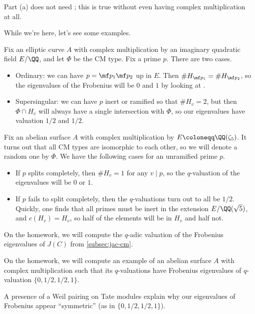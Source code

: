\documentclass[../notes.tex]{subfiles}
\begin{document}
\begin{remark}
	Part (a) does not need ; this is true without even having complex multiplication at all.
\end{remark}
While we're here, let's see some examples.
\begin{example}
	Fix an elliptic curve $A$ with complex multiplication by an imaginary quadratic field $E/\QQ$, and let $\Phi$ be the CM type. Fix a prime $p$. There are two cases.
	\begin{itemize}
		\item Ordinary: we can have $p=\mf p_1\mf p_2$ up in $E$. Then $\#H_{\mf p_1}=\#H_{\mf p_2}$, so the eigenvalues of the Frobenius will be $0$ and $1$ by looking at .
		\item Supersingular: we can have $p$ inert or ramified so that $\#H_v=2$, but then $\Phi\cap H_v$ will always have a single intersection with $\Phi$, so our eigenvalues have valuation $1/2$ and $1/2$.
	\end{itemize}
\end{example}
\begin{example}
	Fix an abelian surface $A$ with complex multiplication by $E\coloneqq\QQ(\zeta_5)$. It turns out that all CM types are isomorphic to each other, so we will denote a random one by $\Phi$. We have the following cases for an unramified prime $p$.
	\begin{itemize}
		\item If $p$ splits completely, then $\#H_v=1$ for any $v\mid p$, so the $q$-valuation of the eigenvalues will be $0$ or $1$.
		\item If $p$ fails to split completely, then the $q$-valuations turn out to all be $1/2$. Quickly, one finds that all primes must be inert in the extension $E/\QQ(\sqrt5)$, and $c(H_v)=H_v$, so half of the elements will be in $H_v$ and half not.
	\end{itemize}
\end{example}
\begin{remark}
	On the homework, we will compute the $q$-adic valuation of the Frobenius eigenvalues of $J(C)$ from \cref{subsec:jac-cm}.
\end{remark}
\begin{remark}
	On the homework, we will compute an example of an abelian surface $A$ with complex multiplication such that its $q$-valuations have Frobenius eigenvalues of $q$-valuation $\{0,1/2,1/2,1\}$.
\end{remark}
\begin{remark}
	A presence of a Weil pairing on Tate modules explain why our eigenvalues of Frobenius appear ``symmetric'' (as in $\{0,1/2,1/2,1\}$).
\end{remark}
\end{document}
